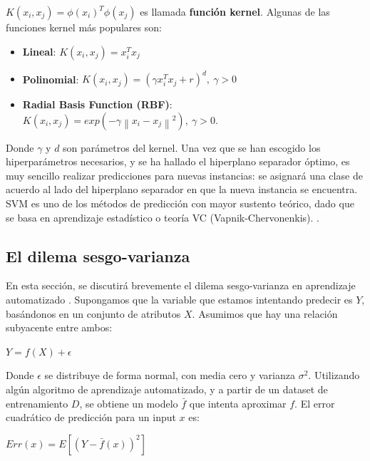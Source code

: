 $K(x_i,x_j) = \phi(x_i)^T \phi(x_j)$ es llamada \textbf{función kernel}. Algunas de las funciones kernel más populares son:

\begin{itemize}
\item \textbf{Lineal}: $K(x_i,x_j) = x_i^T x_j$
\item \textbf{Polinomial}: $K(x_i,x_j)= (\gamma x_i^T x_j + r)^d , \ \gamma > 0$
\item \textbf{Radial Basis Function (RBF)}: $K(x_i,x_j)= exp (-\gamma\left\| x_i - x_j \right\|^2  ), \ \gamma>0.$

\end{itemize}

Donde $\gamma$ y $d$ son parámetros del kernel. Una vez que se han escogido los hiperparámetros necesarios, y se ha hallado el hiperplano separador óptimo, es muy sencillo realizar predicciones para nuevas instancias: se asignará una clase de acuerdo al lado del hiperplano separador en que la nueva instancia se encuentra.  \\

SVM es uno de los métodos de predicción con mayor sustento teórico, dado que se basa en aprendizaje estadístico o teoría VC (Vapnik-Chervonenkis). \cite{vapnik71uniform} \cite{vapnik74theory}.

\subsection{El dilema sesgo-varianza}

En esta sección, se discutirá brevemente el dilema sesgo-varianza en aprendizaje automatizado \cite{statisticallearning}. Supongamos que la variable que estamos intentando predecir es $Y$, basándonos en un conjunto de atributos $X$. Asumimos que hay una relación subyacente entre ambos:
\begin{center}
$Y = f(X) + \epsilon$
\end{center}

Donde $\epsilon$ se distribuye de forma normal, con media cero y varianza $\sigma^2$. Utilizando algún algoritmo de aprendizaje automatizado, y a partir de un dataset de entrenamiento $D$, se obtiene un modelo $\bar{f}$ que intenta aproximar $f$. El error cuadrático de predicción para un input $x$ es:\\

\begin{center}
$Err(x) = E[(Y-\bar{f}(x))^2]$
\end{center}

